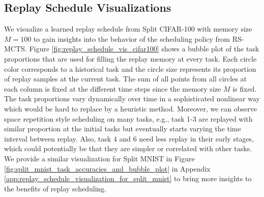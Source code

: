 
\begin{comment}
\begin{figure}[t]
  \centering
  \setlength{\figwidth}{0.46\textwidth}
  \setlength{\figheight}{.22\textheight}
  
  \vspace{-3mm}
  \caption{ Replay schedule learned from Split CIFAR-100 visualized as a bubble plot. %
  The task proportions vary dynamically over time which would be hard to replace by a heuristic method. 
  } 
  \vspace{-3mm}
  \label{fig:replay_schedule_vis_cifar100}
\end{figure}
\end{comment}



\subsection{Replay Schedule Visualizations}
\label{sec:replay_schedule_visualization}

We visualize a learned replay schedule from Split CIFAR-100 with memory size $M=100$ to gain insights into the behavior of the scheduling policy from RS-MCTS. Figure \ref{fig:replay_schedule_vis_cifar100} shows a bubble plot of the task proportions that are used for filling the replay memory at every task. 
Each circle color corresponds to a historical task and the circle size represents its proportion of replay samples at the current task.
The sum of all points from all circles at each column is fixed at the different time steps since the memory size $M$ is fixed. The task proportions vary dynamically over time in a sophisticated nonlinear way which would be hard to replace by a heuristic method. Moreover, we can observe space repetition style scheduling on many tasks, e.g., task 1-3 are replayed with similar proportion at the initial tasks but eventually starts varying the time interval between replay. Also, task 4 and 6 need less replay in their early stages, which could potentially be that they are simpler or correlated with other tasks. We provide a similar visualization for Split MNIST in Figure \ref{fig:split_mnist_task_accuracies_and_bubble_plot} in Appendix \ref{app:replay_schedule_visualization_for_split_mnist} to bring more insights to the benefits of replay scheduling. %




